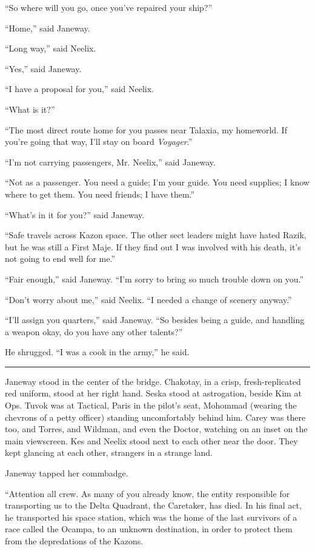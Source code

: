 \documentclass[twoside,letterpaper,12pt]{memoir}
\begin{document}
``So where will you go, once you’ve repaired your ship?” 

``Home,” said Janeway. 

``Long way,” said Neelix. 

``Yes,” said Janeway.

``I have a proposal for you,” said Neelix. 

``What is it?” 

``The most direct route home for you passes near Talaxia, my homeworld. If you’re going that way, I’ll stay on board \textit{Voyager}.” 

``I’m not carrying passengers, Mr. Neelix,” said Janeway. 

``Not as a passenger. You need a guide; I’m your guide. You need supplies; I know where to get them. You need friends; I have them.” 

``What’s in it for you?” said Janeway. 

``Safe travels across Kazon space. The other sect leaders might have hated Razik, but he was still a First Maje. If they find out I was involved with his death, it’s not going to end well for me.” 

``Fair enough,” said Janeway. ``I’m sorry to bring so much trouble down on you.” 

``Don’t worry about me,” said Neelix. ``I needed a change of scenery anyway.” 

``I’ll assign you quarters,” said Janeway. ``So besides being a guide, and handling a weapon okay, do you have any other talents?” 

He shrugged. ``I was a cook in the army,” he said. 

\begin{center}\rule{3cm}{0.4 pt}\end{center} 

Janeway stood in the center of the bridge. Chakotay, in a crisp, fresh-replicated red uniform, stood at her right hand. Seska stood at astrogation, beside Kim at Ops. Tuvok was at Tactical, Paris in the pilot’s seat, Mohommad (wearing the chevrons of a petty officer) standing uncomfortably behind him. Carey was there too, and Torres, and Wildman, and even the Doctor, watching on an inset on the main viewscreen. Kes and Neelix stood next to each other near the door. They kept glancing at each other, strangers in a strange land. 

Janeway tapped her commbadge. 

``Attention all crew. As many of you already know, the entity responsible for transporting us to the Delta Quadrant, the Caretaker, has died. In his final act, he transported his space station, which was the home of the last survivors of a race called the Ocampa, to an unknown destination, in order to protect them from the depredations of the Kazons. 
\end{document}
